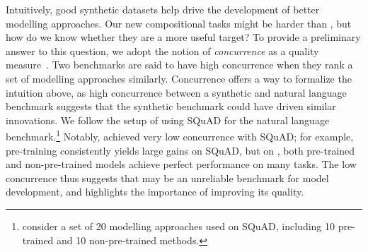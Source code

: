  Intuitively, good synthetic datasets help drive the development of better modelling approaches. Our new compositional tasks might be harder than \babibm, but how do we know whether they are a more useful target? To provide a preliminary answer to this question, we adopt the notion of \emph{concurrence} as a quality measure~\citep{liu2021small}. Two benchmarks are said to have high concurrence when they rank a set of modelling approaches similarly. Concurrence offers a way to formalize the intuition above, as high concurrence between a synthetic and natural language benchmark suggests that the synthetic benchmark could have driven similar innovations. We follow the setup of \citet{liu2021small} using SQuAD for the natural language benchmark.\footnote{\citet{liu2021small} consider a set of 20 modelling approaches used on SQuAD, including 10 pre-trained and 10 non-pre-trained methods.} Notably, \babibm achieved very low concurrence with SQuAD; for example, pre-training consistently yields large gains on SQuAD, but on \babibm, both pre-trained and non-pre-trained models achieve perfect performance on many tasks. The low concurrence thus suggests that \babibm may be an unreliable benchmark for model development, and highlights the importance of improving its quality.



















 






